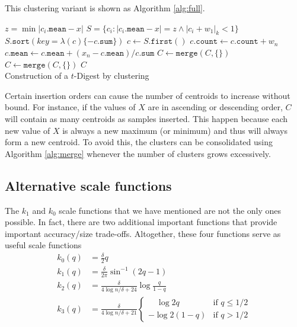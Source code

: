 \documentclass[]{statsoc}
\begin{document}
This clustering variant is shown as Algorithm \ref{alg:full}.
 \begin{algorithm}[htb]
\SetNoFillComment
{}
 {
  $z = \min | c_i.\mathtt{mean} - x |$\;
  $S = \lbrace c_i  :  |c_i.\mathtt{mean} - x| = z \wedge |c_i+w_1|_k < 1 \rbrace $\;
   {
       $S.\mathtt{sort}( key=\lambda (c) \lbrace -c.\mathtt{sum} \rbrace)$\;
       $c \gets S.\mathtt{first()}$ \;
       $c.\mathtt{count} \gets c.\mathtt{count} + w_n$\;
       $c.\mathtt{mean} \gets c.\mathtt{mean} + (x_n- c.\mathtt{mean})/ c.\mathtt{sum}$\;
     } 
       {
         $C \gets \mathtt{merge}( C, \lbrace\rbrace ) $\;
       }
} 
$C \gets \mathtt{merge}( C, \lbrace\rbrace ) $\;
\Return $ C $\\
\caption{Construction of a $t$-Digest by clustering \label{alg:full}}
\end{algorithm}

Certain insertion orders can cause the number of centroids to increase without bound. For instance, if the values of $X$ are in ascending or descending order, $C$ will contain as many centroids as samples inserted.  This happen because each new value of $X$ is always a new maximum (or minimum) and thus will always form a new centroid.  To avoid this, the clusters can be consolidated using Algorithm \ref{alg:merge} whenever the number of clusters grows excessively.  

\subsection{Alternative scale functions}
The $k_1$ and $k_0$ scale functions that we have mentioned are not the only ones possible. In fact, there are two additional important functions that provide important accuracy/size trade-offs. Altogether, these four functions serve as useful scale functions
\begin{align}
k_0(q) &= \frac \delta 2 q \\
k_1(q) &= \frac \delta {2\pi}  \sin^{-1}(2q-1)   \\
k_2(q) &= \frac \delta {4 \log n/\delta + 24} \log {\frac q {1-q}} \\
k_3(q) &= \frac \delta {4\log n/\delta + 21}\begin{cases}
\quad \log 2q & \text{if  } q \le 1/2 \\
- \log 2(1-q) & \text{if  } q > 1/2
\end{cases}
\end{align}
\end{document}
